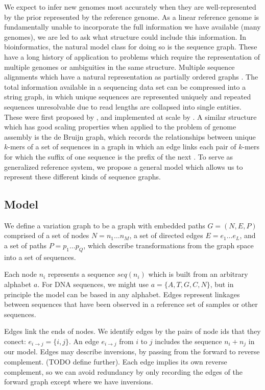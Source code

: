 \documentclass{article}
\begin{document}
We expect to infer new genomes most accurately when they are well-represented by the prior represented by the reference genome.
As a linear reference genome is fundamentally unable to incorporate the full information we have available (many genomes), we are led to ask what structure could include this information.
In bioinformatics, the natural model class for doing so is the sequence graph.
These have a long history of application to problems which require the representation of multiple genomes or ambiguities in the same structure.
Multiple sequence alignments which have a natural representation as partially ordered graphs \cite{lee2002POA}.
The total information available in a sequencing data set can be compressed into a string graph, in which unique sequences are represented uniquely and repeated sequences unresolvable due to read lengths are collapsed into single entities. These were first proposed by \cite{myers2005}, and implemented at scale by \cite{simpson2010}.
A similar structure which has good scaling properties when applied to the problem of genome assembly is the de Bruijn graph, which records the relationships between unique $k$-mers of a set of sequences in a graph in which an edge links each pair of $k$-mers for which the suffix of one sequence is the prefix of the next \cite{iqbal2012}.
To serve as generalized reference system, we propose a general model which allows us to represent these different kinds of sequence graphs.

\subsection{Model}

We define a variation graph to be a graph with embedded paths $G = ( N, E, P )$ comprised of a set of nodes $N = n_1 \ldots n_M$, a set of directed edges $E = e_1 \ldots e_L$, and a set of paths $P = p_1 \ldots p_Q$, which describe transformations from the graph space into a set of sequences.

Each node $n_i$ represents a sequence $seq(n_i)$ which is built from an arbitrary alphabet $a$.
For DNA sequences, we might use $a = \{ A, T, G, C, N \}$, but in principle the model can be based in any alphabet.
Edges represent linkages between sequences that have been observed in a reference set of samples or other sequences.

Edges link the ends of nodes. 
We identify edges by the pairs of node ids that they conect: $e_{i \rightarrow j} = \{ i, j \}$.
An edge $e_{i \rightarrow j}$ from $i$ to $j$ includes the sequence $n_i + n_j$ in our model.
Edges may describe inversions, by passing from the forward to reverse complement.
(TODO define further).
Each edge implies its own reverse complement, so we can avoid redundancy by only recording the edges of the forward graph except where we have inversions.
\end{document}
